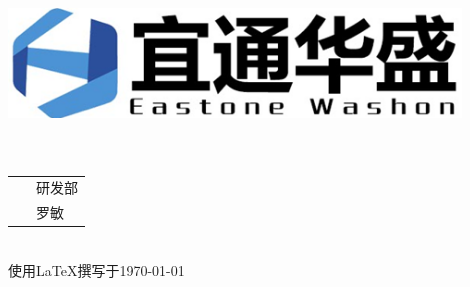 \documentclass[a4paper,12pt]{report}
\begin{document}
\begin{titlepage}
	\begin{center}
		
    \includegraphics[width=0.9\textwidth]{figure//etws.png}\\
    \vspace{40mm}
    \textbf{}\\[0.8cm]
    \textbf{}\\[3cm]
    
	\vspace{\fill}
	
\setlength{\extrarowheight}{3mm}
{\songti{}	
\begin{tabular}{rl}
	
	{\makebox[4\ccwd][s]{部\qquad 门：}}& ~\kaishu 研发部\\
	
	{\makebox[4\ccwd][s]{编\qquad 制：}}& ~\kaishu 罗敏 \\ 

\end{tabular}
 }\\[2cm]
\vspace{\fill}
使用\LaTeX 撰写于\today
	\end{center}	
\end{titlepage}

\begin{abstract}
\begin{spacing}{1.5}
	{
	本文主要是关于雷达系统远程控制网络的体系结构设计，目的是实现全国各地雷达系统的远程监
	测与控制，主要是从两个方面来考虑如何设计实现，第一是从可操作性方面来考虑,因整个控制
	网连接的设备较多，特别是雷达设备甚至可能是位于郊区等人迹罕至的地方，将所有的接入设备
	都连接固定IP专网接口是不太现实的，而且费用过高，方案必须符合实际具有可操作性。第二个
	是从安全性的角度，整个系统分布与全国各地，且连接的雷达用户各不相同，需要考虑用户之间
	的隔离，以及防止非法的网络入侵破坏雷达系统工作。要实现这两个目的，通过可以采用VPN技
	术,将分布于各地的雷达设备、控制主机和后端管理服务器配置成为一个虚拟专网，这样的设计
	只需要位于后端的VPN服务器一个固定IP，其它设备只需要连接普通的互联网服务便可以实现目
	的，费用低廉具有可操作性,且VPN的数据传输采用了多重加密技术可以有效防止数据泄露。

	\textbf{关键字}：\quad 远程监控 \quad VPN \quad 虚拟专网 \quad 安全性
	}
\end{spacing}
\end{abstract}
\end{document}
